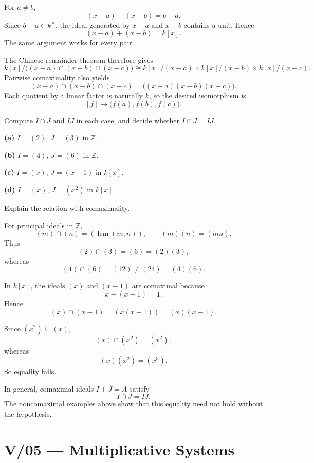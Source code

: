\begin{solution}
For \(a\ne b\),
\[
(x-a)-(x-b)=b-a.
\]
Since \(b-a\in k^\times\), the ideal generated by \(x-a\) and \(x-b\)
contains a unit. Hence
\[
(x-a)+(x-b)=k[x].
\]
The same argument works for every pair.

The Chinese remainder theorem therefore gives
\[
k[x]\Big/\bigl((x-a)\cap(x-b)\cap(x-c)\bigr)
\cong
k[x]/(x-a)\times k[x]/(x-b)\times k[x]/(x-c).
\]
Pairwise comaximality also yields
\[
(x-a)\cap(x-b)\cap(x-c)
=
\bigl((x-a)(x-b)(x-c)\bigr).
\]
Each quotient by a linear factor is naturally \(k\), so the desired
isomorphism is
\[
[f]\longmapsto\bigl(f(a),f(b),f(c)\bigr).
\]
\end{solution}


\begin{problem}[CP-V-0009]
\label{prob:cp-v-0009}
Compute \(I\cap J\) and \(IJ\) in each case, and decide whether
\(I\cap J=IJ\).

\textbf{(a)} \(I=(2)\), \(J=(3)\) in \(\mathbb Z\).

\textbf{(b)} \(I=(4)\), \(J=(6)\) in \(\mathbb Z\).

\textbf{(c)} \(I=(x)\), \(J=(x-1)\) in \(k[x]\).

\textbf{(d)} \(I=(x)\), \(J=(x^2)\) in \(k[x]\).

Explain the relation with comaximality.
\end{problem}

\begin{solution}
For principal ideals in \(\mathbb Z\),
\[
(m)\cap(n)=(\operatorname{lcm}(m,n)),
\qquad
(m)(n)=(mn).
\]
Thus
\[
(2)\cap(3)=(6)=(2)(3),
\]
whereas
\[
(4)\cap(6)=(12)\ne(24)=(4)(6).
\]

In \(k[x]\), the ideals \((x)\) and \((x-1)\) are comaximal because
\[
x-(x-1)=1.
\]
Hence
\[
(x)\cap(x-1)=(x(x-1))=(x)(x-1).
\]

Since \((x^2)\subseteq(x)\),
\[
(x)\cap(x^2)=(x^2),
\]
whereas
\[
(x)(x^2)=(x^3).
\]
So equality fails.

In general, comaximal ideals \(I+J=A\) satisfy
\[
I\cap J=IJ.
\]
The noncomaximal examples above show that this equality need not hold
without the hypothesis.
\end{solution}



\section*{V/05 --- Multiplicative Systems}

